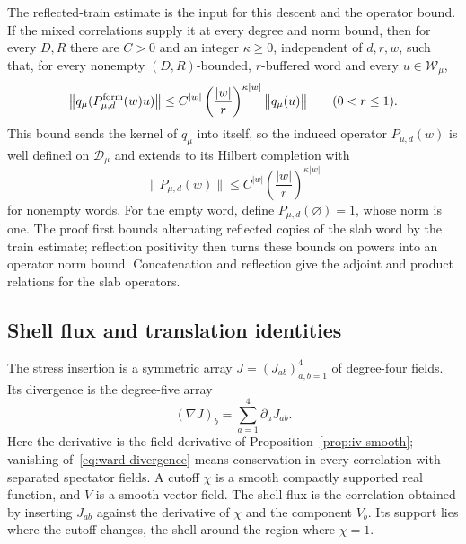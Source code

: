 The reflected-train estimate is the input for this descent and the operator bound. If the mixed correlations supply it at every degree and norm bound, then for every $D,R$ there are $C>0$ and an integer $\kappa\ge0$, independent of $d,r,w$, such that, for every nonempty $(D,R)$-bounded, $r$-buffered word and every $u\in\mathcal W_\mu$,
\begin{equation*}
 \bigl\|q_\mu(P^{\rm form}_{\mu,d}(w)u)\bigr\|
 \le C^{|w|}\left(\frac{|w|}{r}\right)^{\kappa|w|}\bigl\|q_\mu(u)\bigr\|
 \qquad(0<r\le1).
\end{equation*}
This bound sends the kernel of $q_\mu$ into itself, so the induced operator $P_{\mu,d}(w)$ is well defined on $\mathcal D_\mu$ and extends to its Hilbert completion with
\begin{equation}\label{eq:ward-slab-bound}
 \|P_{\mu,d}(w)\|
 \le C^{|w|}\left(\frac{|w|}{r}\right)^{\kappa|w|}
\end{equation}
for nonempty words. For the empty word, define $P_{\mu,d}(\varnothing)=1$, whose norm is one. The proof first bounds alternating reflected copies of the slab word by the train estimate; reflection positivity then turns these bounds on powers into an operator norm bound. Concatenation and reflection give the adjoint and product relations for the slab operators.


\subsection{Shell flux and translation identities}
\label{subsec:ward-flux}

The stress insertion is a symmetric array $J=(J_{ab})_{a,b=1}^4$ of degree-four fields. Its divergence is the degree-five array
\begin{equation}\label{eq:ward-divergence}
 (\nabla J)_b=\sum_{a=1}^4\partial_aJ_{ab}.
\end{equation}
Here the derivative is the field derivative of Proposition~\ref{prop:iv-smooth}; vanishing of~\eqref{eq:ward-divergence} means conservation in every correlation with separated spectator fields. A cutoff $\chi$ is a smooth compactly supported real function, and $V$ is a smooth vector field. The shell flux is the correlation obtained by inserting $J_{ab}$ against the derivative of $\chi$ and the component $V_b$. Its support lies where the cutoff changes, the shell around the region where $\chi=1$.

